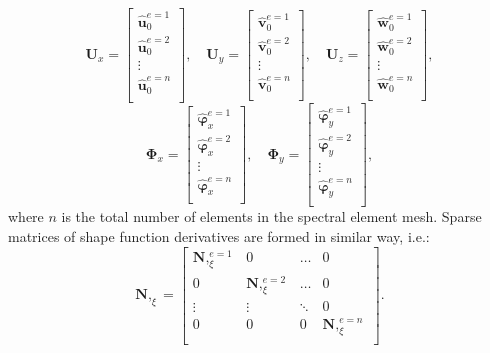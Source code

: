 \documentclass[preprint,12pt]{elsarticle}
\renewcommand{\vec}[1]{\mathbf{#1}}
\renewcommand{\bm}[1]{\mathbf{#1}}
\newcommand{\bs}[1]{\boldsymbol{#1}}
\begin{document}
	\begin{equation}
	\vec{U}_x = \left[
	\begin{array}{c}  
	\hat{\vec{u}}_0^{e=1}  \\[2pt]
	\hat{\vec{u}}_0^{e=2} \\[2pt]
	\vdots\\[2pt]
	\hat{\vec{u}}_0^{e=n}\\[2pt]
	\end{array}\right],
	\quad
	\vec{U}_y = \left[
	\begin{array}{c}  
	\hat{\vec{v}}_0^{e=1}  \\[2pt]
	\hat{\vec{v}}_0^{e=2} \\[2pt]
	\vdots\\[2pt]
	\hat{\vec{v}}_0^{e=n}\\[2pt]
	\end{array}\right],
	\quad
	\vec{U}_z = \left[
	\begin{array}{c}  
	\hat{\vec{w}}_0^{e=1}  \\[2pt]
	\hat{\vec{w}}_0^{e=2} \\[2pt]
	\vdots\\[2pt]
	\hat{\vec{w}}_0^{e=n}\\[2pt]
	\end{array}\right],
	\end{equation}
	\begin{equation}
	\bs{\Phi}_x = \left[
	\begin{array}{c}  
	\hat{\bs{\varphi}}_x^{e=1}  \\[2pt]
	\hat{\bs{\varphi}}_x^{e=2} \\[2pt]
	\vdots\\[2pt]
	\hat{\bs{\varphi}}_x^{e=n}\\[2pt]
	\end{array}\right],
	\quad
	\bs{\Phi}_y = \left[
	\begin{array}{c}  
	\hat{\bs{\varphi}}_y^{e=1}  \\[2pt]
	\hat{\bs{\varphi}}_y^{e=2} \\[2pt]
	\vdots\\[2pt]
	\hat{\bs{\varphi}}_y^{e=n}\\[2pt]
	\end{array}\right],
	\end{equation}
	where $n$ is the total number of elements in the spectral element mesh. Sparse matrices of shape function derivatives are formed in similar way, i.e.:
	\begin{equation}
	\bm{N},_{\xi} = \left[
	\begin{array}{cccc}  
		\bm{N},_{\xi}^{e=1} & 0 & \ldots & 0\\[2pt]
		0& \bm{N},_{\xi}^{e=2}  & \ldots& 0\\[2pt]
		\vdots&\vdots&\ddots&0\\[2pt]
		0& 0 &0&\bm{N},_{\xi}^{e=n}\\[2pt]
	\end{array}\right].
	\end{equation}
\end{document}
